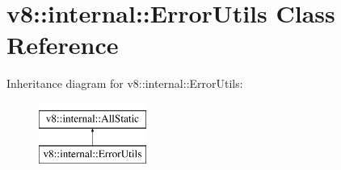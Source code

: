 \hypertarget{classv8_1_1internal_1_1ErrorUtils}{}\section{v8\+:\+:internal\+:\+:Error\+Utils Class Reference}
\label{classv8_1_1internal_1_1ErrorUtils}
Inheritance diagram for v8\+:\+:internal\+:\+:Error\+Utils\+:\begin{figure}[H]
\begin{center}
\leavevmode
\includegraphics[height=2.000000cm]{classv8_1_1internal_1_1ErrorUtils}
\end{center}
\end{figure}
